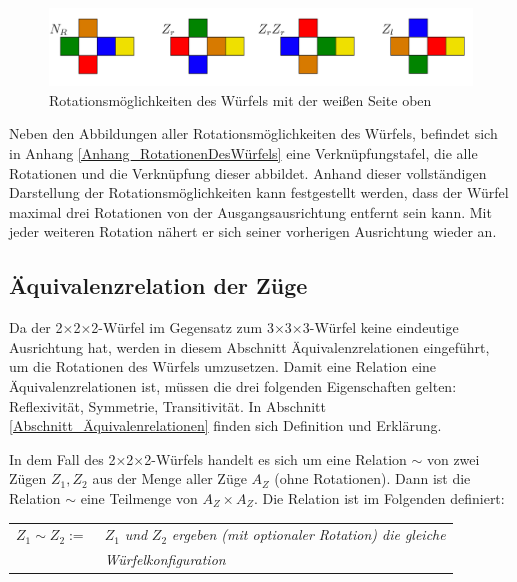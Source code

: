 \documentclass[12pt,a4paper, usenames, dvipsnames]{article}
\theoremstyle{mystyle}
\theoremstyle{definition}
\newcommand{\Ttwo}{2$\times$2$\times$2-}
\newcommand{\Tthree}{3$\times$3$\times$3-}
\begin{document}
\begin{figure}[H]
\centering
\includegraphics[scale=0.06]{RotationWeiss.png}
\caption{Rotationsmöglichkeiten des Würfels mit der weißen Seite oben}
\label{AbbildungWürfelRotationWeisseSeite}
\end{figure}

Neben den Abbildungen aller Rotationsmöglichkeiten des Würfels, befindet sich in Anhang \ref{Anhang_RotationenDesWürfels} eine Verknüpfungstafel, die alle Rotationen und die Verknüpfung dieser abbildet. Anhand dieser vollständigen Darstellung der Rotationsmöglichkeiten kann festgestellt werden, dass der Würfel maximal drei Rotationen von der Ausgangsausrichtung entfernt sein kann. Mit jeder weiteren Rotation nähert er sich seiner vorherigen Ausrichtung wieder an.





%
%
%
%
%
%
%
%
%
%
%
%
%
%
%
%
%
%
%
%

\subsection{Äquivalenzrelation der Züge}
\label{Abschnitt_ÄquivalenzrelationDerZüge}

Da der \Ttwo Würfel im Gegensatz zum \Tthree Würfel keine eindeutige Ausrichtung hat, werden in diesem Abschnitt Äquivalenzrelationen eingeführt, um die Rotationen des Würfels umzusetzen.
Damit eine Relation eine Äquivalenzrelationen ist, müssen die drei folgenden Eigenschaften gelten: Reflexivität, Symmetrie, Transitivität. In Abschnitt \ref{Abschnitt_Äquivalenrelationen} finden sich Definition und Erklärung.

In dem Fall des \Ttwo Würfels handelt es sich um eine Relation $\sim$ von zwei Zügen $Z_1, Z_2$ aus der Menge aller Züge $A_Z$ (ohne Rotationen). Dann ist die Relation $\sim$ eine Teilmenge von $A_Z \times A_Z$. 
Die Relation ist im Folgenden definiert: 

\begin{center}
\begin{tabular}{l l}
$Z_1 \sim Z_2 := \ $  & $Z_1$ \textit{und} $Z_2$ \textit{ergeben (mit optionaler Rotation) die gleiche }\\
\  & \textit{Würfelkonfiguration} \\
\end{tabular} 
\end{center}
\end{document}
